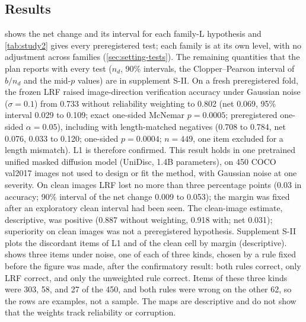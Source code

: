 \subsection{Results}\label{sec:study2-results}
 shows the net change and its interval for each family-L hypothesis and \cref{tab:study2} gives every preregistered test; each family is at its own level, with
no adjustment across families (\cref{sec:setting-tests}).
The remaining quantities that the plan reports with every test ($n_d$, 90\% intervals, the Clopper--Pearson interval of $b/n_d$ and
the mid-$p$ values) are in supplement S-II.
On a fresh preregistered fold, the frozen LRF raised image-direction verification accuracy under Gaussian noise ($\sigma=0.1$) from 0.733
without reliability weighting to 0.802 (net 0.069, 95\% interval 0.029 to 0.109; exact one-sided McNemar $p=0.0005$; preregistered
one-sided $\alpha=0.05$), including with length-matched negatives
(0.708 to 0.784, net 0.076, 0.033 to 0.120; one-sided $p=0.0004$; $n=449$, one item excluded for a length mismatch).
L1 is therefore confirmed.
This result holds in one pretrained unified masked diffusion model (UniDisc, 1.4B parameters), on 450 COCO val2017 images not used to design or fit
the method, with Gaussian noise at one severity.
On clean images LRF lost no more than three percentage points (0.03 in accuracy; 90\% interval of the net change 0.009 to 0.053); the margin was fixed after an
exploratory clean interval had been seen.
The clean-image estimate, descriptive, was positive (0.887 without weighting, 0.918 with; net 0.031); superiority on clean images was not a
preregistered hypothesis.
Supplement S-II plots the discordant items of L1 and of the clean cell by margin (descriptive).
 shows three items under noise, one of each of three kinds, chosen by a rule fixed before the figure was made, after the confirmatory result: both rules correct, only LRF correct, and only the
unweighted rule correct.
Items of these three kinds were 303, 58, and 27 of the 450, and both rules were wrong on the other 62, so the rows are examples, not a sample.
The maps are descriptive and do not show that the weights track reliability or corruption.


